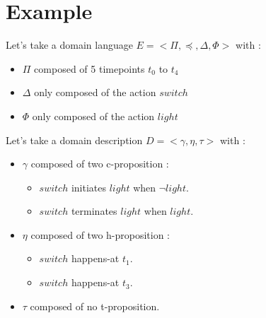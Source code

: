 \section{Example}\label{sec:example}

Let's take a domain language $E=<\Pi,\preceq,\Delta,\Phi>$ with :
\begin{itemize}
  \item $\Pi$ composed of 5 timepoints $t_0$ to $t_4$
  \item $\Delta$ only composed of the action $switch$
  \item $\Phi$ only composed of the action $light$
\end{itemize}

Let's take a domain description $D=<\gamma,\eta,\tau>$ with :
\begin{itemize}
  \item $\gamma$ composed of two c-proposition :
  \begin{itemize}
    \item $switch$ initiates $light$ when $\neg light$.
    \item $switch$ terminates $light$ when $light$.
  \end{itemize}
  \item $\eta$ composed of two h-proposition :
  \begin{itemize}
    \item $switch$ happens-at $t_1$.
    \item $switch$ happens-at $t_3$.
  \end{itemize}
  \item $\tau$ composed of no t-proposition.
\end{itemize}

